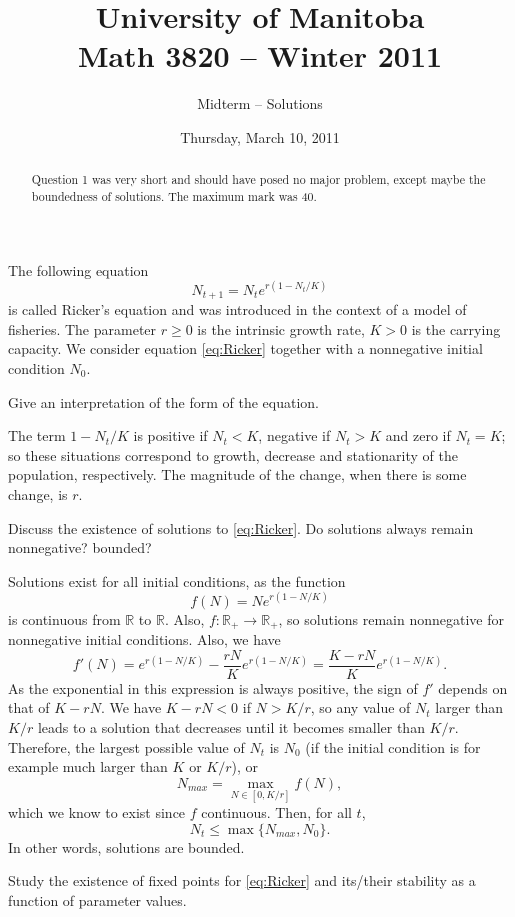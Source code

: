 \documentclass[12pt]{article}
\title{University of Manitoba\\ Math 3820 -- Winter 2011}
\author{Midterm -- Solutions}
\date{Thursday, March 10, 2011}
\theoremstyle{plain}
\def\IR{\mathbb{R}}
\begin{document}
\maketitle
\begin{abstract}
Question 1 was very short and should have posed no major problem, except maybe the boundedness of solutions. The maximum mark was 40.
\end{abstract}

\thispagestyle{empty}


The following equation
\begin{equation}\label{eq:Ricker}
N_{t+1}=N_t e^{r(1-N_t/K)}
\end{equation}
is called Ricker's equation and was introduced in the context of a model of fisheries. The parameter $r\geq 0$ is the intrinsic growth rate, $K>0$ is the carrying capacity. We consider equation \eqref{eq:Ricker} together with a nonnegative initial condition $N_0$.

Give an interpretation of the form of the equation.

The term $1-N_t/K$ is positive if $N_t<K$, negative if $N_t>K$ and zero if $N_t=K$; so these situations correspond to growth, decrease and stationarity of the population, respectively. The magnitude of the change, when there is some change, is $r$.


Discuss the existence of solutions to \eqref{eq:Ricker}. Do solutions always remain nonnegative? bounded?

Solutions exist for all initial conditions, as the function
\[
f(N)=Ne^{r(1-N/K)}
\]
is continuous from $\IR$ to $\IR$. Also, $f:\IR_+\to\IR_+$, so solutions remain nonnegative for nonnegative initial conditions. Also, we have
\[
f'(N)=e^{r(1-N/K)}-\frac{rN}{K}e^{r(1-N/K)}=\frac{K-rN}{K}e^{r(1-N/K)}.
\]
As the exponential in this expression is always positive, the sign of $f'$ depends on that of $K-rN$. We have $K-rN<0$ if $N>K/r$, so any value of $N_t$ larger than $K/r$ leads to a solution that decreases until it becomes smaller than $K/r$. Therefore, the largest possible value of $N_t$ is $N_0$ (if the initial condition is for example much larger than $K$ or $K/r$), or 
\[
N_{max}=\max_{N\in[0,K/r]}f(N),
\]
which we know to exist since $f$ continuous. Then, for all $t$, 
\[
N_t\leq\max\{N_{max},N_0\}.
\]
In other words, solutions are bounded.


Study the existence of fixed points for \eqref{eq:Ricker} and its/their stability as a function of parameter values.
\end{document}
